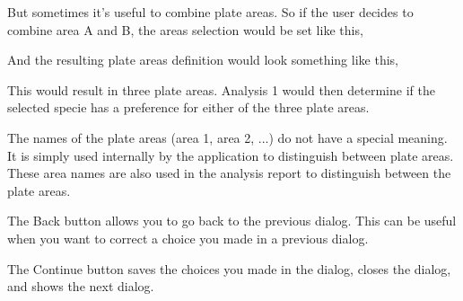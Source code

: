 \documentclass[letterpaper,10pt,english]{sphinxmanual}
\begin{document}
But sometimes it's useful to combine plate areas. So if the user decides
to combine area A and B, the areas selection would be set like this,
\begin{figure}[htbp]
\centering

\end{figure}

And the resulting plate areas definition would look something like this,
\begin{figure}[htbp]
\centering

\end{figure}

This would result in three plate areas. Analysis 1 would then determine
if the selected specie has a preference for either of the three plate
areas.

The names of the plate areas (area 1, area 2, ...) do not have a
special meaning. It is simply used internally by the application to
distinguish between plate areas. These area names are also used in the
analysis report to distinguish between the plate areas.

The Back button allows you to go back to the previous dialog. This can
be useful when you want to correct a choice you made in a previous
dialog.

The Continue button saves the choices you made in the dialog, closes
the dialog, and shows the next dialog.
\end{document}

